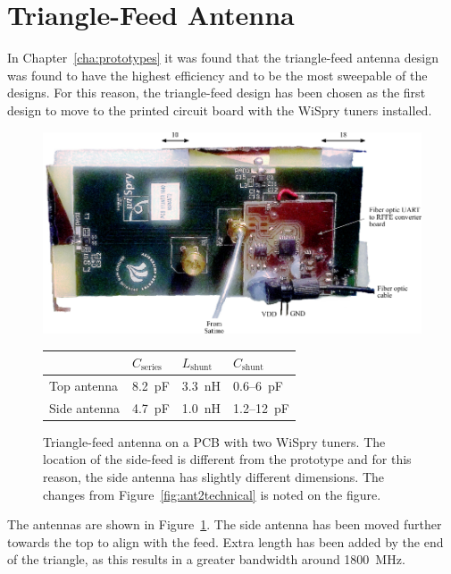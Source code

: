 \section{Triangle-Feed Antenna}
\label{sec:triag_proto_wispry}

In Chapter~\ref{cha:prototypes} it was found that the triangle-feed antenna design was found to have the highest efficiency and to be the most sweepable of the designs. For this reason, the triangle-feed design has been chosen as the first design to move to the printed circuit board with the WiSpry tuners installed. 

\begin{figure}[htbp]
    \centering
    \includegraphics{img/tech_sol/pcb_trianglefeed/pcb_enh}\\[2em]
    \footnotesize
    \begin{tabular}{|l|l|l|l|}
        \hline
        & $C_{\text{series}}$ & $L_{\text{shunt}}$ & $C_{\text{shunt}}$ \\
        \hline
        Top antenna & \SI{8.2}{pF} & \SI{3.3}{nH} & 0.6--\SI{6}{pF} \\
        Side antenna & \SI{4.7}{pF} & \SI{1.0}{nH} & 1.2--\SI{12}{pF} \\
        \hline
    \end{tabular}
    \caption{Triangle-feed antenna on a PCB with two WiSpry tuners. The location of the side-feed is different from the prototype and for this reason, the side antenna has slightly different dimensions. The changes from Figure~\ref{fig:ant2technical} is noted on the figure.}
    \label{fig:triang_pcb_enh}
\end{figure}

The antennas are shown in Figure~\ref{fig:triang_pcb_enh}. The side antenna has been moved further towards the top to align with the feed. Extra length has been added by the end of the triangle, as this results in a greater bandwidth around \SI{1800}{MHz}.

